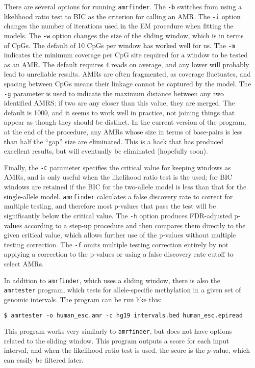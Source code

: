 \documentclass[10pt]{article}
\newcommand{\prog}[1]{\texttt{#1}}
\newcommand{\op}[1]{\texttt{#1}}
\begin{document}
{{There are several options for running \prog{amrfinder}. The \op{-b}
switches from using a likelihood ratio test to BIC as the criterion
for calling an AMR. The \op{-i} option changes the number of
iterations used in the EM procedure when fitting the models.
The \op{-w} option changes the size of the sliding
window, which is in terms of CpGs. The default of 10 CpGs per window
has worked well for us. The \op{-m} indicates the minimum coverage per
CpG site required for a window to be tested as an AMR. The default
requires 4 reads on average, and any lower will probably lead to
unreliable results. AMRs are often fragmented, as coverage fluctuates,
and spacing between CpGs means their linkage cannot be captured by the
model. The \op{-g} parameter is used to indicate the maximum distance
between any two identified AMRS; if two are any closer than this
value, they are merged. The default is 1000, and it seems to work well
in practice, not joining things that appear as though they should be
distinct. In the current version of the program, at the end of the
procedure, any AMRs whose size in terms of base-pairs is less than
half the ``gap'' size are eliminated. This is a hack that has produced
excellent results, but will eventually be eliminated (hopefully
soon).

Finally, the \op{-C} parameter specifies the critical value for
keeping windows as AMRs, and is only useful when the likelihood ratio
test is the used; for BIC windows are retained if the BIC for the
two-allele model is less than that for the single-allele model.
\prog{amrfinder} calculates a false discovery rate to correct for
multiple testing, and therefore most p-values that pass the test
will be significantly below the critical value. The \op{-h} option
produces FDR-adjusted p-values according to a step-up procedure
and then compares them directly to the given critical value, which
allows further use of the p-values without multiple testing correction.
The \op{-f} omits multiple testing correction entirely by not applying
a correction to the p-values or using a false discovery rate cutoff
to select AMRs.

In addition to \prog{amrfinder}, which uses a sliding window, there is
also the \prog{amrtester} program, which tests for allele-specific
methylation in a given set of genomic intervals. The program can be
run like this:
\begin{verbatim}
$ amrtester -o human_esc.amr -c hg19 intervals.bed human_esc.epiread
\end{verbatim}
This program works very similarly to \prog{amrfinder}, but does not
have options related to the sliding window. This program outputs a
score for each input interval, and when the likelihood ratio test is
used, the score is the $p$-value, which can easily be filtered later.

}}
\end{document}
